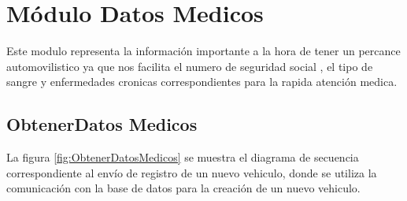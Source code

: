 
\section{Módulo Datos Medicos}
Este modulo representa la información importante a la hora de tener un percance automovilistico ya que nos facilita el numero de seguridad social , el tipo de sangre y enfermedades cronicas correspondientes para la rapida atención medica.\\




\subsection{ObtenerDatos Medicos}

La figura \ref{fig:ObtenerDatosMedicos} se muestra el diagrama de secuencia correspondiente al envío de registro de un nuevo vehiculo, donde se utiliza la comunicación con la base de datos para la creación de un nuevo vehiculo.

